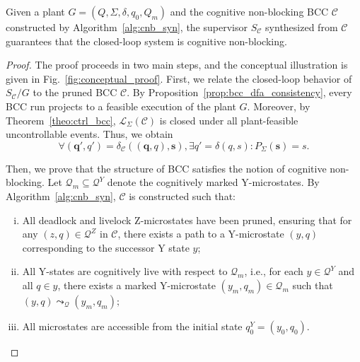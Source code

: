 \documentclass[journal,twoside,web]{ieeecolor}
\begin{document}
\begin{theorem}\label{theo:cnb}
Given a plant $G = (Q, \Sigma, \delta, q_0, Q_m)$ and the cognitive non-blocking BCC $\mathcal{C}$ constructed by Algorithm~\ref{alg:cnb_syn}, 
the supervisor $S_{\mathcal{C}}$ synthesized from $\mathcal{C}$ guarantees that the closed-loop system is cognitive non-blocking.
\end{theorem}
%
\begin{proof}
The proof proceeds in two main steps, and the conceptual illustration is given in Fig.~\ref{fig:conceptual_proof}.
%
First, we relate the closed-loop behavior of $S_{\mathcal{C}}/G$ to the pruned BCC $\mathcal{C}$.
By Proposition~\ref{prop:bcc_dfa_consistency}, every BCC run projects to a feasible execution of the plant $G$.
Moreover, by Theorem~\ref{theo:ctrl_bcc}, 
$\mathcal{L}_{\Sigma}(\mathcal{C})$ is closed under all plant-feasible uncontrollable events.
Thus, we obtain
$$
\forall (\bm{q'}, q') = \delta_\mathcal{C}((\bm{q}, q), \bm{s}), \exists q' = \delta(q, s) :
P_\Sigma(\bm{s}) = s.
$$
%
%

% 
Then, we prove that the structure of BCC satisfies the notion of cognitive non-blocking.
%
Let $\bm{\mathcal{Q}}_m \subseteq \bm{\mathcal{Q}}^Y$ denote the cognitively marked Y-microstates.  
By Algorithm~\ref{alg:cnb_syn}, $\mathcal{C}$ is constructed such that:
%
\begin{enumerate}[(i)]
    \item All deadlock and livelock Z-microstates have been pruned, ensuring that for any $(z,q) \in \bm{\mathcal{Q}}^Z$ in $\mathcal{C}$, there exists a path to a Y-microstate $(y, q)$ corresponding to the successor Y state $y$;
    \item All Y-states are cognitively live with respect to $\bm{\mathcal{Q}}_m$, i.e., for each $y \in \bm{\mathcal{Q}}^Y$ and all $q \in y$, there exists a marked Y-microstate $(y_m, q_m) \in \bm{\mathcal{Q}}_m$ such that
    $
        (y,q) \leadsto_{\bm{\mathcal{Q}}} (y_m,q_m);
    $  
    \item All microstates are accessible from the initial state $q^Y_0 = (y_0, q_0)$.
\end{enumerate}
%


\end{proof}
\end{document}
